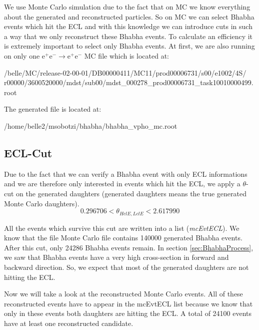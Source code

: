 \documentclass[a4paper,11pt,twosided,final,german,openbib,pdftex,listof=totoc,bibliography=totoc]{scrbook}
\begin{document}
We use Monte Carlo simulation due to the fact that on MC we know everything about the generated and reconstructed particles. So on MC we can select Bhabha events which hit the ECL and with this knowledge we can introduce cuts in such a way that we only reconstruct these Bhabha events. To calculate an efficiency it is extremely  important to select only Bhabha events. At first, we are also running on only one $\textrm{e}^+ \textrm{e}^- \rightarrow \textrm{e}^+ \textrm{e}^-$ MC file which is located at:
\newline

/belle/MC/release-02-00-01/DB00000411/MC11/prod00006731/s00/e1002/4S/
r00000/3600520000/mdst/sub00/mdst\_000278\_prod00006731\_task10010000499.root
\newline

The generated file is located at:

 /home/belle2/msobotzi/bhabha/bhabha\_vpho\_mc.root
\newline


\subsection{ECL-Cut}

Due to the fact that we can verify a Bhabha event with only ECL informations and we are therefore only interested in events which hit the ECL, we apply a $\theta$-cut on the generated daughters (generated daughters means the true generated Monte Carlo daughters). 
\begin{equation}
	0.296706 < \theta_{HclE,LclE} < 2.617990
\end{equation}

All the events which survive this cut are written into a list (\textit{mcEvtECL}). We know that the file Monte Carlo file contains 140000 generated Bhabha events. After this cut, only 24286 Bhabha events remain.
In section \ref{sec:BhabhaProcess}, we saw that Bhabha events have a very high cross-section in forward and backward  direction. So, we expect that most of the generated daughters are not hitting the ECL. 
\newline





Now we will take a look at the reconstructed Monte Carlo events. All of these reconstructed events have to appear in the mcEvtECL list because we know that only in these events both daughters are hitting the ECL. A total of 24100 events have at least one reconstructed candidate.
\end{document}
